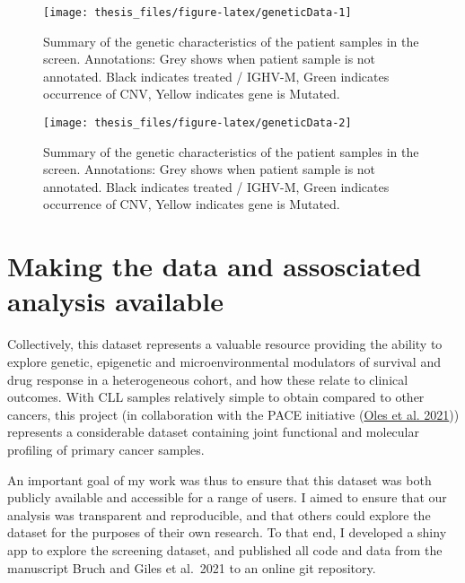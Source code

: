 \documentclass[11pt, a4paper, twosided]{book}
\begin{document}
\begin{figure}

{\centering \texttt{[image: thesis\_files/figure-latex/geneticData-1]} 

}

\caption{Summary of the genetic characteristics of the patient samples in the screen. Annotations: Grey shows when patient sample is not annotated. Black indicates treated / IGHV-M, Green indicates occurrence of CNV, Yellow indicates gene is Mutated.}\label{fig:geneticData-1}
\end{figure}
\begin{figure}

{\centering \texttt{[image: thesis\_files/figure-latex/geneticData-2]} 

}

\caption{Summary of the genetic characteristics of the patient samples in the screen. Annotations: Grey shows when patient sample is not annotated. Black indicates treated / IGHV-M, Green indicates occurrence of CNV, Yellow indicates gene is Mutated.}\label{fig:geneticData-2}
\end{figure}
\hypertarget{making-the-data-and-assosciated-analysis-available}{%
\section{Making the data and assosciated analysis available}\label{making-the-data-and-assosciated-analysis-available}}

Collectively, this dataset represents a valuable resource providing the ability to explore genetic, epigenetic and microenvironmental modulators of survival and drug response in a heterogeneous cohort, and how these relate to clinical outcomes. With CLL samples relatively simple to obtain compared to other cancers, this project (in collaboration with the PACE initiative (\protect\hyperlink{ref-R-BloodCancerMultiOmics2017}{Oles et al. 2021})) represents a considerable dataset containing joint functional and molecular profiling of primary cancer samples.

An important goal of my work was thus to ensure that this dataset was both publicly available and accessible for a range of users. I aimed to ensure that our analysis was transparent and reproducible, and that others could explore the dataset for the purposes of their own research. To that end, I developed a shiny app to explore the screening dataset, and published all code and data from the manuscript Bruch and Giles et al.~2021 to an online git repository.
\end{document}

